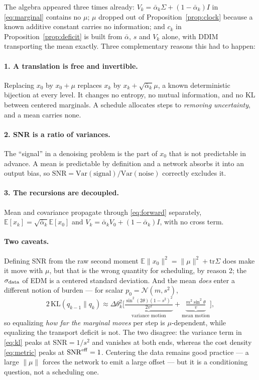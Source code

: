 \documentclass[11pt]{article}
\theoremstyle{definition}
\newcommand{\abar}{\bar\alpha}
\newcommand{\snr}{\mathrm{SNR}}
\newcommand{\Var}{\mathrm{Var}}
\newcommand{\E}{\mathbb{E}}
\newcommand{\Tr}{\mathrm{tr}}
\begin{document}
The algebra appeared three times already: $V_k=\abar_k\Sigma+(1-\abar_k)I$ in
\eqref{eq:marginal} contains no $\mu$; $\mu$ dropped out of
Proposition~\ref{prop:clock} because a known additive constant carries no
information; and $c_k$ in Proposition~\ref{prop:deficit} is built from $\abar$,
$s$ and $V_k$ alone, with DDIM transporting the mean exactly. Three
complementary reasons this had to happen:

\paragraph{1. A translation is free and invertible.} Replacing $x_0$ by
$x_0+\mu$ replaces $x_k$ by $x_k+\sqrt{\abar_k}\mu$, a known deterministic
bijection at every level. It changes no entropy, no mutual information, and no KL
between centered marginals. A schedule allocates steps to \emph{removing
uncertainty}, and a mean carries none.

\paragraph{2. SNR is a ratio of variances.} The ``signal'' in a denoising
problem is the part of $x_0$ that is not predictable in advance. A mean is
predictable by definition and a network absorbs it into an output bias, so
$\snr=\Var(\text{signal})/\Var(\text{noise})$ correctly excludes it.

\paragraph{3. The recursions are decoupled.} Mean and covariance propagate
through \eqref{eq:forward} separately, $\E[x_k]=\sqrt{\abar_k}\E[x_0]$ and
$V_k=\abar_kV_0+(1-\abar_k)I$, with no cross term.

\paragraph{Two caveats.} Defining SNR from the raw second moment
$\E\|x_0\|^2=\|\mu\|^2+\Tr\Sigma$ does make it move with $\mu$, but that is the
wrong quantity for scheduling, by reason 2; the $\sigma_{\rm data}$ of EDM
\cite{karras2022elucidating} is a centered standard deviation. And the mean
\emph{does} enter a different notion of burden --- for scalar
$p_0=\mathcal N(m,s^2)$,
\begin{equation}
  2\,\mathrm{KL}(q_{k-1}\|q_k)\approx\Delta\theta_k^2
  \Big[\underbrace{\tfrac{\sin^2(2\theta)(1-s^2)^2}{2v^2}}_{\text{variance motion}}
  +\underbrace{\tfrac{m^2\sin^2\theta}{v}}_{\text{mean motion}}\Big],
  \label{eq:kl}
\end{equation}
so equalizing \emph{how far the marginal moves} per step is $\mu$-dependent,
while equalizing the transport deficit is not. The two disagree: the variance
term in \eqref{eq:kl} peaks at $\snr=1/s^2$ and vanishes at both ends, whereas the
cost density \eqref{eq:metric} peaks at $\snr^{\rm eff}=1$. Centering the data
remains good practice --- a large $\|\mu\|$ forces the network to emit a large
offset --- but it is a conditioning question, not a scheduling one.
\end{document}
